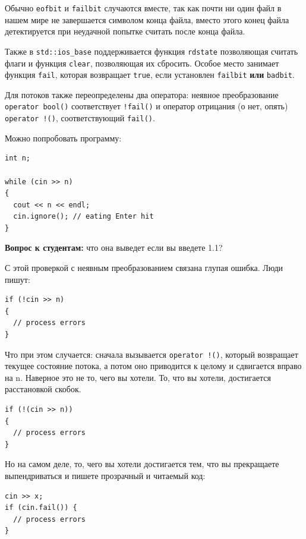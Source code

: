 \documentclass[a4paper,12pt,oneside]{article}
\newif\ifanswers
\begin{document}
Обычно \lstinline!eofbit! и \lstinline!failbit! случаются вместе, так как почти ни один файл в нашем мире не завершается символом конца файла, вместо этого конец файла детектируется при неудачной попытке считать после конца файла.

Также в \lstinline!std::ios_base! поддерживается функция \lstinline!rdstate! позволяющая считать флаги и функция \lstinline!clear!, позволяющая их сбросить. Особое место занимает функция \lstinline!fail!, которая возвращает \lstinline!true!, если установлен \lstinline!failbit! \textbf{или} \lstinline!badbit!.

Для потоков также переопределены два оператора: неявное преобразование \lstinline!operator bool()! соответствует \lstinline?!fail()? и оператор отрицания (о нет, опять) \lstinline?operator !()?, соответствующий \lstinline?fail()?.

Можно попробовать программу:

\begin{lstlisting}
int n;

while (cin >> n)
{
  cout << n << endl;
  cin.ignore(); // eating Enter hit
}
\end{lstlisting}

\textbf{Вопрос к студентам:} что она выведет если вы введете 1.1?

\ifanswers
Правильный ответ: она выведет
\begin{verbatim}
1 
1
\end{verbatim}
так как точка будет съедена в ignore.
\fi

С этой проверкой с неявным преобразованием связана глупая ошибка. Люди пишут:

\begin{lstlisting}
if (!cin >> n)
{
  // process errors
}
\end{lstlisting}

Что при этом случается: сначала вызывается \lstinline?operator !()?, который возвращает текущее состояние потока, а потом оно приводится к целому и сдвигается вправо на n. Наверное это не то, чего вы хотели. То, что вы хотели, достигается расстановкой скобок.

\begin{lstlisting}
if (!(cin >> n))
{
  // process errors
}
\end{lstlisting}

Но на самом деле, то, чего вы хотели достигается тем, что вы прекращаете выпендриваться и пишете прозрачный и читаемый код:

\begin{lstlisting}
cin >> x;
if (cin.fail()) {
  // process errors
}
\end{lstlisting}
\end{document}
